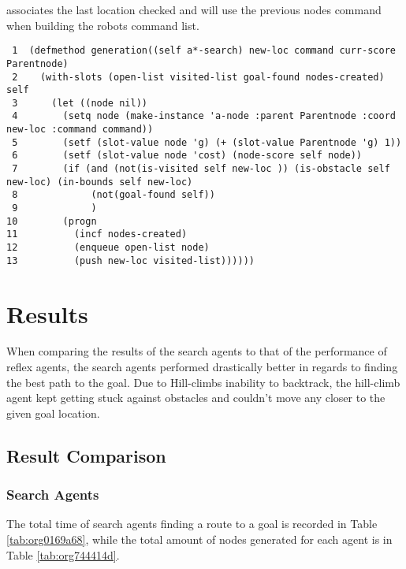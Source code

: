 \documentclass[11pt]{article}
\begin{document}
associates the last location checked and will use the previous nodes command when building the
robots command list. \\
\begin{verbatim}
 1  (defmethod generation((self a*-search) new-loc command curr-score Parentnode)
 2    (with-slots (open-list visited-list goal-found nodes-created) self
 3      (let ((node nil))
 4        (setq node (make-instance 'a-node :parent Parentnode :coord new-loc :command command))
 5        (setf (slot-value node 'g) (+ (slot-value Parentnode 'g) 1))
 6        (setf (slot-value node 'cost) (node-score self node))
 7        (if (and (not(is-visited self new-loc )) (is-obstacle self new-loc) (in-bounds self new-loc)
 8  	       (not(goal-found self)) 
 9  	       )
10  	  (progn
11  	    (incf nodes-created)
12  	    (enqueue open-list node)
13  	    (push new-loc visited-list))))))      
\end{verbatim}
\section{Results}
\label{sec:org611dba1}

When comparing the results of the search agents to that of the performance of reflex agents, the search agents performed
drastically better in regards to finding the best path to the goal. Due to Hill-climbs inability to backtrack,
the hill-climb agent kept getting stuck against obstacles and couldn't move any closer to the given goal location.

\subsection{Result Comparison}
\label{sec:orga0198a0}
\subsubsection{Search Agents}
\label{sec:org8c1bba5}
The total time of search agents finding a route to a goal
is recorded in Table \ref{tab:org0169a68}, while the total amount of nodes generated for each agent is in Table \ref{tab:org744414d}.
\end{document}

